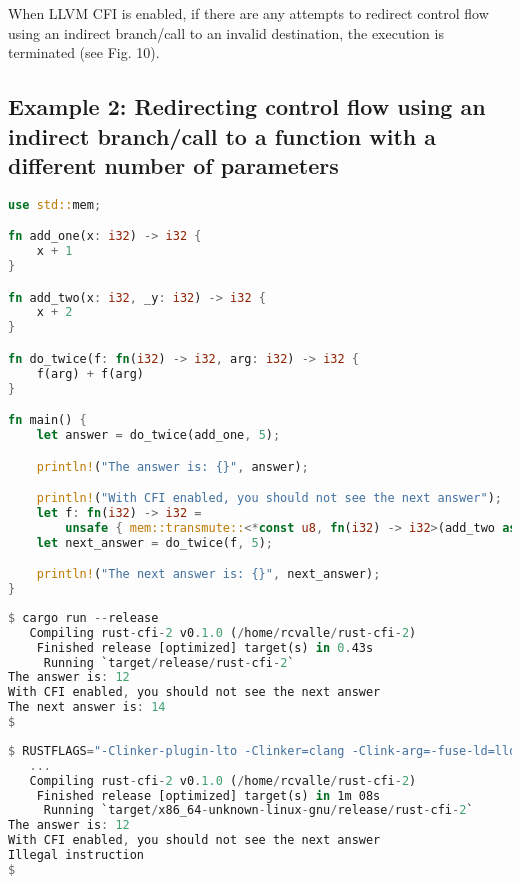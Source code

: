 \documentclass{article}
\begin{document}
When LLVM CFI is enabled, if there are any attempts to redirect control flow using an indirect branch/call to an invalid destination, the execution is terminated (see Fig. 10).


\subsection{Example 2: Redirecting control flow using an indirect branch/call to a function with a different number of parameters}

\begin{lstlisting}[language=Rust, caption={Redirecting control flow using an indirect branch/call to a function with a different number of parameters than arguments intended/passed in the call/branch site.}]
use std::mem;

fn add_one(x: i32) -> i32 {
    x + 1
}

fn add_two(x: i32, _y: i32) -> i32 {
    x + 2
}

fn do_twice(f: fn(i32) -> i32, arg: i32) -> i32 {
    f(arg) + f(arg)
}

fn main() {
    let answer = do_twice(add_one, 5);

    println!("The answer is: {}", answer);

    println!("With CFI enabled, you should not see the next answer");
    let f: fn(i32) -> i32 =
        unsafe { mem::transmute::<*const u8, fn(i32) -> i32>(add_two as *const u8) };
    let next_answer = do_twice(f, 5);

    println!("The next answer is: {}", next_answer);
}
\end{lstlisting}

\begin{lstlisting}[language=Rust, caption={Build and execution of Fig. 11 with LLVM CFI disabled.}]
$ cargo run --release
   Compiling rust-cfi-2 v0.1.0 (/home/rcvalle/rust-cfi-2)
    Finished release [optimized] target(s) in 0.43s
     Running `target/release/rust-cfi-2`
The answer is: 12
With CFI enabled, you should not see the next answer
The next answer is: 14
$
\end{lstlisting}

\begin{lstlisting}[language=Rust, caption={Build and execution of Fig. 11 with LLVM CFI enabled.}]
$ RUSTFLAGS="-Clinker-plugin-lto -Clinker=clang -Clink-arg=-fuse-ld=lld -Zsanitizer=cfi" cargo run -Zbuild-std -Zbuild-std-features --release --target x86_64-unknown-linux-gnu
   ...
   Compiling rust-cfi-2 v0.1.0 (/home/rcvalle/rust-cfi-2)
    Finished release [optimized] target(s) in 1m 08s
     Running `target/x86_64-unknown-linux-gnu/release/rust-cfi-2`
The answer is: 12
With CFI enabled, you should not see the next answer
Illegal instruction
$
\end{lstlisting}
\end{document}
